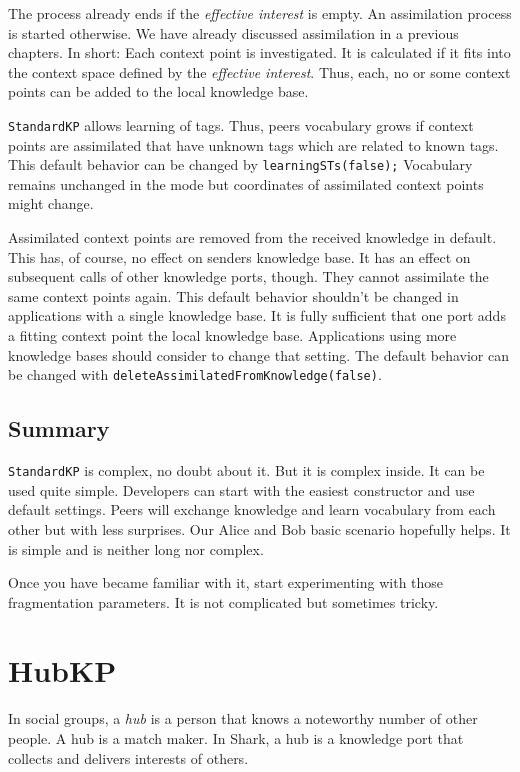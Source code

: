 {The process already ends if the {\it effective interest} is empty. An assimilation process is started otherwise. We have already discussed assimilation in a previous chapters. In short: Each context point is investigated. It is calculated if it fits into the context space defined by the {\it effective interest}. Thus, each, no or some context points can be added to the local knowledge base.

{\tt StandardKP} allows learning of tags. Thus, peers vocabulary grows if context points are assimilated that have unknown tags which are related to known tags. This default behavior can be changed by {\tt learningSTs(false);} Vocabulary remains unchanged in the mode but coordinates of assimilated context points might change.

Assimilated context points are removed from the received knowledge in default. This has, of course, no effect on senders knowledge base. It has an effect on subsequent calls of other knowledge ports, though. They cannot assimilate the same context points again. This default behavior shouldn't be changed in applications with a single knowledge base. It is fully sufficient that one port adds a fitting context point the local knowledge base. Applications using more knowledge bases should consider to change that setting. The default behavior can be changed with {\tt deleteAssimilatedFromKnowledge(false)}.

\subsection{Summary}
{\tt StandardKP} is complex, no doubt about it. But it is complex inside. It can be used quite simple. Developers can start with the easiest constructor and use default settings. Peers will exchange knowledge and learn vocabulary from each other but with less surprises. Our Alice and Bob basic scenario hopefully helps.
It is simple and is neither long nor complex.

Once you have became familiar with it, start experimenting with those fragmentation parameters. It is not complicated but sometimes tricky.

\section{HubKP}
\label{sec:hubkp}
In social groups, a {\it hub} is a person that knows a noteworthy number of other people. A hub is a match maker. In Shark, a hub is a knowledge port that collects and delivers interests of others.

}

